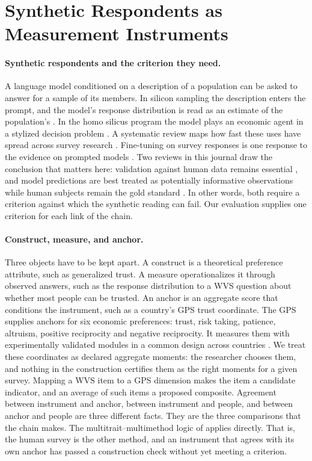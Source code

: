 \section{Synthetic Respondents as Measurement Instruments}\label{sec:background}

\paragraph{Synthetic respondents and the criterion they need.} A language model conditioned on a description of a population can be asked to answer for a sample of its members. In silicon sampling the description enters the prompt, and the model's response distribution is read as an estimate of the population's \citep{argyle2023}. In the homo silicus program the model plays an economic agent in a stylized decision problem \citep{horton2023}. A systematic review maps how fast these uses have spread across survey research \citep{buskirk2026}. Fine-tuning on survey responses is one response to the evidence on prompted models \citep{suh2025,cao2025,krsteski2026}. Two reviews in this journal draw the conclusion that matters here: validation against human data remains essential \citep{kozlowski2025}, and model predictions are best treated as potentially informative observations while human subjects remain the gold standard \citep{broska2025}. In other words, both require a criterion against which the synthetic reading can fail. Our evaluation supplies one criterion for each link of the chain.

\paragraph{Construct, measure, and anchor.} Three objects have to be kept apart. A construct is a theoretical preference attribute, such as generalized trust. A measure operationalizes it through observed answers, such as the response distribution to a WVS question about whether most people can be trusted. An anchor is an aggregate score that conditions the instrument, such as a country's GPS trust coordinate. The GPS supplies anchors for six economic preferences: trust, risk taking, patience, altruism, positive reciprocity and negative reciprocity. It measures them with experimentally validated modules in a common design across countries \citep{falk2018}. We treat these coordinates as declared aggregate moments: the researcher chooses them, and nothing in the construction certifies them as the right moments for a given survey. Mapping a WVS item to a GPS dimension makes the item a candidate indicator, and an average of such items a proposed composite. Agreement between instrument and anchor, between instrument and people, and between anchor and people are three different facts. They are the three comparisons that the chain makes. The multitrait--multimethod logic of \citet{campbellfiske1959} applies directly. That is, the human survey is the other method, and an instrument that agrees with its own anchor has passed a construction check without yet meeting a criterion.

